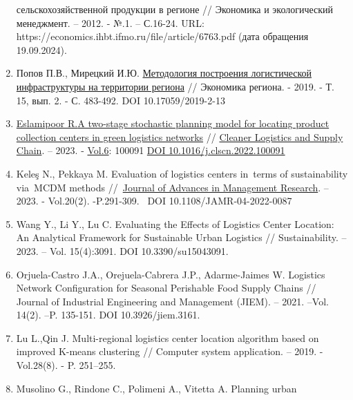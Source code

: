 \begin{enumerate}
  сельскохозяйственной продукции в регионе // Экономика и экологический
  менеджмент. -- 2012. - №.1. -- С.16-24. URL:
  https://economics.ihbt.ifmo.ru/file/article/6763.pdf (дата обращения
  19.09.2024).
\item
  Попов П.В., Мирецкий И.Ю.
  \href{https://economyofregion.ru/arhiv/2019-2/nomer-2-2019/metodologiya-postroeniya-logisticheskoj-infrastruktury-na-territorii-regiona/}{Методология
  построения логистической инфраструктуры на территории региона} //
  Экономика региона. - 2019. - Т. 15, вып. 2. - С. 483-492. DOI
  10.17059/2019-2-13
\item
  \href{https://www.scopus.com/authid/detail.uri?origin=resultslist&authorId=55624611200&zone=}{Eslamipoor
  R.}\href{https://www.scopus.com/record/display.uri?eid=2-s2.0-85146138004&origin=resultslist&sort=plf-f&src=s&st1=logistics+center&sid=608c0e84c46c21631ea70ffcaa21b2a6&sot=b&sdt=b&sl=23&s=TITLE\%28logistics+center\%29&relpos=0&citeCnt=0&searchTerm=}{A
  two-stage stochastic planning model for locating product collection
  centers in green logistics networks} //
  \href{https://www.scopus.com/sourceid/21101098869?origin=resultslist}{Cleaner
  Logistics and Supply Chain}. -- 2023. -
  \href{https://www.sciencedirect.com/journal/cleaner-logistics-and-supply-chain/vol/6/suppl/C}{Vol.6}:
  100091 \href{https://doi.org/10.1016/j.clscn.2022.100091}{DOI
  10.1016/j.clscn.2022.100091}
\item
  Keleş N., Pekkaya M. Evaluation of logistics centers in~terms of
  sustainability via~MCDM methods
  //~\href{https://www.emerald.com/insight/publication/issn/0972-7981}{Journal
  of Advances in Management Research}. -- 2023. - Vol.20(2).
  -P.291-309.~ DOI 10.1108/JAMR-04-2022-0087
\item
  Wang Y., Li Y., Lu C. Evaluating the Effects of Logistics Center
  Location: An Analytical Framework for Sustainable Urban Logistics //
  Sustainability. -- 2023. -- Vol. 15(4):3091. DOI 10.3390/su15043091.
\item
  Orjuela-Castro J.A., Orejuela-Cabrera J.P., Adarme-Jaimes W. Logistics
  Network Configuration for Seasonal Perishable Food Supply Chains //
  Journal of Industrial Engineering and Management (JIEM). -- 2021.
  --Vol. 14(2). --P. 135-151. DOI 10.3926/jiem.3161.
\item
  Lu L.,Qin J. Multi-regional logistics center location algorithm based
  on improved K-means clustering // Computer system application. --
  2019. - Vol.28(8). - P. 251--255.
\item
  Musolino G., Rindone C., Polimeni A., Vitetta A. Planning urban

\end{enumerate}
